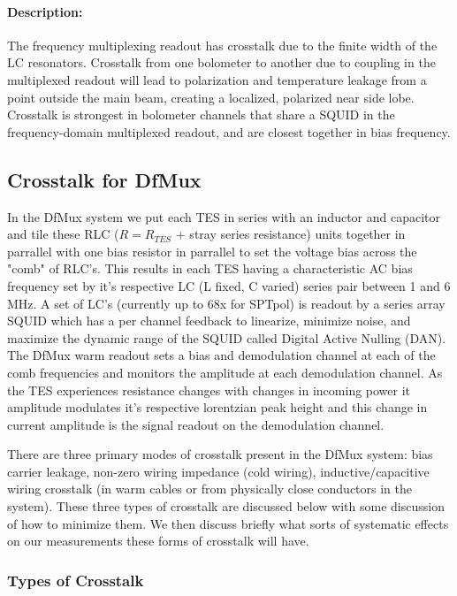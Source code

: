 \paragraph{Description:}
The frequency multiplexing readout has crosstalk due to the finite width of the LC resonators.
Crosstalk from one bolometer to another due to coupling in the multiplexed readout will lead to polarization and temperature leakage from a point outside the main beam, creating a localized, polarized near side lobe. Crosstalk is strongest in bolometer channels that share a SQUID in the frequency-domain multiplexed readout, and are closest together in bias frequency.

\subsection{Crosstalk for DfMux}
In the DfMux system we put each TES in series with an inductor and capacitor and tile these RLC ($R=R_{TES}$ + stray series resistance) units together in parrallel with one bias resistor in parrallel to set the voltage bias across the "comb" of RLC's. This results in each TES having a characteristic AC bias frequency set by it's respective LC (L fixed, C varied) series pair between 1 and 6 MHz. A set of LC's (currently up to 68x for SPTpol) is readout by a series array SQUID which has a per channel feedback to linearize, minimize noise, and maximize the dynamic range of the SQUID called Digital Active Nulling (DAN). The DfMux warm readout sets a bias and demodulation channel at each of the comb frequencies and monitors the amplitude at each demodulation channel. As the TES experiences resistance changes with changes in incoming power it amplitude modulates it's respective lorentzian peak height and this change in current amplitude is the signal readout on the demodulation channel. 

There are three primary modes of crosstalk present in the DfMux system: bias carrier leakage, non-zero wiring impedance (cold wiring), inductive/capacitive wiring crosstalk (in warm cables or from physically close conductors in the system). These three types of crosstalk are discussed below with some discussion of how to minimize them. We then discuss briefly what sorts of systematic effects on our measurements these forms of crosstalk will have.

\subsubsection{Types of Crosstalk}
\setcounter{equation}{0}
